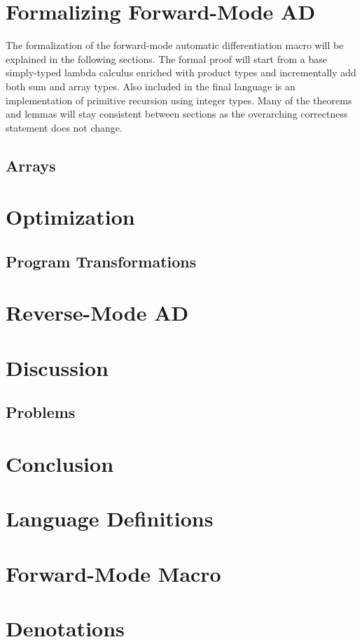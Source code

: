 \documentclass[11pt, final]{article}
\begin{document}

\newpage


\newpage

\setcounter{page}{3}
\tableofcontents
\newpage

% 


% 
% 
% 
% 
% 

\section{Formalizing Forward-Mode AD}
  The formalization of the forward-mode automatic differentiation macro will be explained in the following sections.
  The formal proof will start from a base simply-typed lambda calculus enriched with product types and incrementally add both sum and array types.
  Also included in the final language is an implementation of primitive recursion using integer types.
  Many of the theorems and lemmas will stay consistent between sections as the overarching correctness statement does not change.

  

  \subsection{Arrays}
\section{Optimization}
  \subsection{Program Transformations}
\section{Reverse-Mode AD}
\section{Discussion}
  \subsection{Problems}
  
\section{Conclusion}

\appendix
\section{Language Definitions}
\section{Forward-Mode Macro}
\section{Denotations}
\printbibliography
\makeatother
\end{document}
